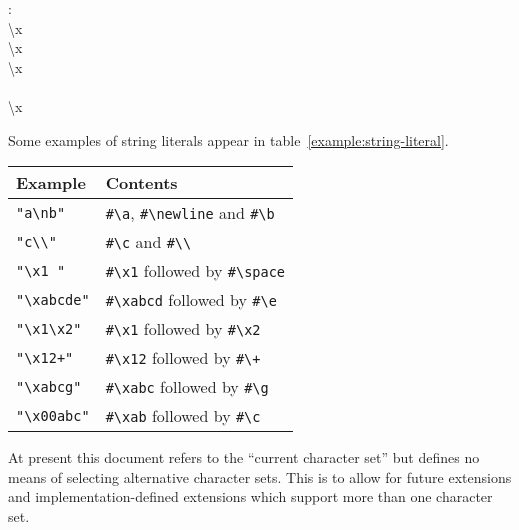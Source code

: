 \begin{optDefinition}
{\begin{syntax}
   : \\
   \>  \textbackslash{}x  \\
   \>  \textbackslash{}x   \\
   \>  \textbackslash{}x   \\
   \>\>   \\
   \>  \textbackslash{}x   \\
   \>\>   
\end{syntax}}%

Some examples of string literals appear in table~\ref{example:string-literal}.
%
\begin{example}
\label{example:string-literal}
\begin{center}
\begin{tabular}{|ll|}\hline
    Example & Contents\\\hline
    \verb+"a\nb"+ & \verb+#\a+, \verb+#\newline+ and \verb+#\b+\\
    \verb+"c\\"+ & \verb+#\c+ and \verb+#\\+\\
    \verb+"\x1 "+ & \verb+#\x1+ followed by \verb+#\space+\\
    \verb+"\xabcde"+ & \verb+#\xabcd+ followed by \verb+#\e+\\
    \verb+"\x1\x2"+ & \verb+#\x1+ followed by \verb+#\x2+\\
    \verb-"\x12+"- & \verb+#\x12+ followed by \verb-#\+-\\
    \verb+"\xabcg"+ & \verb+#\xabc+ followed by \verb+#\g+\\
    \verb+"\x00abc"+ & \verb+#\xab+ followed by \verb+#\c+\\\hline
\end{tabular}
\end{center}
\end{example}
%
\begin{note}
    At present this document refers to the ``current character set'' but
    defines no means of selecting alternative character sets.  This is to
    allow for future extensions and implementation-defined extensions
    which support more than one character set.

\end{note}
\end{optDefinition}
